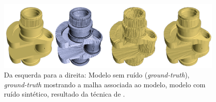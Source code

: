 \begin{figure}[!h]
\captionsetup{width=\linewidth}
\centering
\includegraphics[width=\linewidth]{figuras/irregularSampling.png}
\caption{Da esquerda para a direita: Modelo sem ruído (\textit{ground-truth}), \textit{ground-truth} mostrando a malha associada ao modelo, modelo com ruído sintético, resultado da técnica de \cite{zhang2015guided}. }
\label{fig:irregularSampling}
\end{figure}













